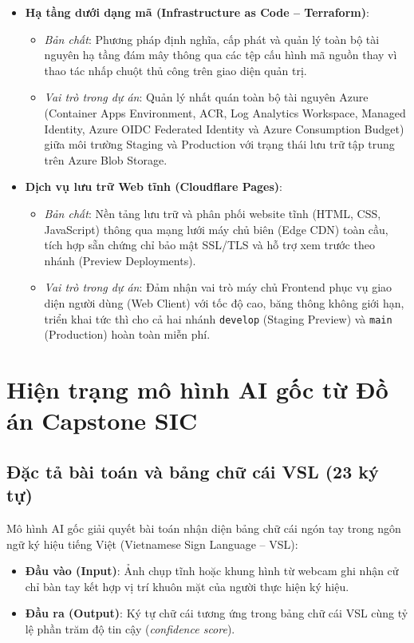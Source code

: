 \begin{itemize}
    \item \textbf{Hạ tầng dưới dạng mã (Infrastructure as Code -- Terraform)}:
    \begin{itemize}
        \item \textit{Bản chất}: Phương pháp định nghĩa, cấp phát và quản lý toàn bộ tài nguyên hạ tầng đám mây thông qua các tệp cấu hình mã nguồn thay vì thao tác nhấp chuột thủ công trên giao diện quản trị.
        \item \textit{Vai trò trong dự án}: Quản lý nhất quán toàn bộ tài nguyên Azure (Container Apps Environment, ACR, Log Analytics Workspace, Managed Identity, Azure OIDC Federated Identity và Azure Consumption Budget) giữa môi trường Staging và Production với trạng thái lưu trữ tập trung trên Azure Blob Storage.
    \end{itemize}

    \item \textbf{Dịch vụ lưu trữ Web tĩnh (Cloudflare Pages)}:
    \begin{itemize}
        \item \textit{Bản chất}: Nền tảng lưu trữ và phân phối website tĩnh (HTML, CSS, JavaScript) thông qua mạng lưới máy chủ biên (Edge CDN) toàn cầu, tích hợp sẵn chứng chỉ bảo mật SSL/TLS và hỗ trợ xem trước theo nhánh (Preview Deployments).
        \item \textit{Vai trò trong dự án}: Đảm nhận vai trò máy chủ Frontend phục vụ giao diện người dùng (Web Client) với tốc độ cao, băng thông không giới hạn, triển khai tức thì cho cả hai nhánh \texttt{develop} (Staging Preview) và \texttt{main} (Production) hoàn toàn miễn phí.
    \end{itemize}
\end{itemize}


\section{Hiện trạng mô hình AI gốc từ Đồ án Capstone SIC}
\label{sec:hien_trang_sic}

\subsection{Đặc tả bài toán và bảng chữ cái VSL (23 ký tự)}
\label{subsec:dac_ta_vsl}

Mô hình AI gốc giải quyết bài toán nhận diện bảng chữ cái ngón tay trong ngôn ngữ ký hiệu tiếng Việt (Vietnamese Sign Language -- VSL):
\begin{itemize}
    \item \textbf{Đầu vào (Input)}: Ảnh chụp tĩnh hoặc khung hình từ webcam ghi nhận cử chỉ bàn tay kết hợp vị trí khuôn mặt của người thực hiện ký hiệu.
    \item \textbf{Đầu ra (Output)}: Ký tự chữ cái tương ứng trong bảng chữ cái VSL cùng tỷ lệ phần trăm độ tin cậy (\textit{confidence score}).
\end{itemize}

